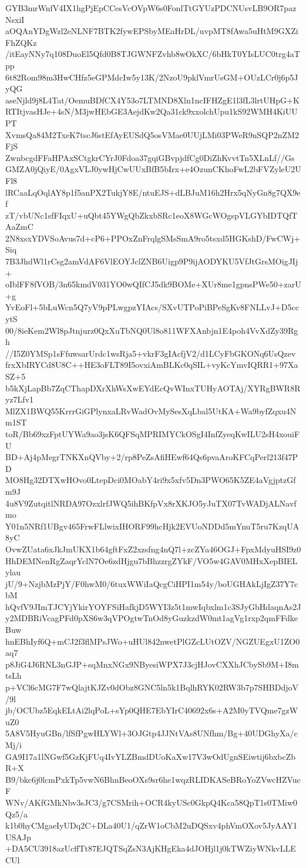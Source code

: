 GYB3mrWnfV4IX1hgPjEpCCesVcOVpW6s0FonlTtGYUzPDCNUsvLB9OR7pazNsxiI
aOQAnYDgWzl2eNLNF7BTK2fywEPSbyMEaHrDL/uvpMT8fAwa5uHtM9GXZiFhZQKz
/itEayNNy7q108DuoEl5Qfd0B8TJGWNFZvhb8wOkXC/6bHkT0YIsLUC0trg4aTpp
6t82Rom98m3HwCHfz5eGPMdcIw5y13K/2NzoU9pklVmrUsGM+OUzLCr0j6p5JyQG
aseNjld9j8L4Tat/OemuBDfCX4Y53o7LTMND8Xln1ncIFHZgE1l3fL3lrtUHpG+K
RTItjvasHJe+4sN/M3jwHEbGE3AejdKw2Qa31ck9xxolchUpu1kS92WMH4KiUUPT
XvmsQa84M2TxeK7tscJ6stEfAyEUSdQ5osVMae0UUjLMi03PWeR9nSQP2nZM2FjS
ZwnbcgdFFaHPAxSCtgkrCYrJ0Fdoa37gqiGBvpjdfCg0DiZhKvvtTn5XLnLf//Gs
GMZA0jQiyE/0AgxVLJ0ywHjCwUUxBfB5bIrx+e4OzunCKhoFwL2bFVZyleU2UFl8
lRCaaLqOqlAY8p1f5anPX2TukjY8E/ntuEJS+dLBJuM16h2Hrx5qNyGn8g7QX9ef
zT/vbUNc1sfFIqxU+uQbt45YWgQbZkxbSRc1eoX8WGcWOgspVLGYbIDTQfTAaZmC
2N8xsxYDVSoAvus7d+cP6+PPOxZnFrqlgSMsSmA9ro5tsxd5HGKshD/FwCWj+Siq
7B3JhdWl1rCsg2amVdAF6VlEOYJclZNB6Uigp9P9ijAODYKU5VfJtGrsMOigJIj+
oIblFF8fVOB/3n65kmdV031YO0wQIfCJ5dk9BOMe+XUr8me1gpnsPWe50+zarU+g
YvEoFl+5bLuWcn5Q7yV9pPLwgpzYIAcs/SXvUTPoPiBPeSgKv8FNLLvJ+D5ccytS
00/8ieKem2Wl8pJtnjurz0QxXuTbNQ0Ul8o811WFXAnbjn1E4poh4VvXdZy39Rgh
//I5Z0YMSp1sFfuwsarUrdc1wsRja5+vkrF3gIAcfjV2/d1LCyFbGKONq6UsQzev
frxXbIRYCd8U8C++HE3oFLT89I5ovxiAmBLKc0qSIL+vyKcYmvIQRR1+97XaSZ+5
b5kXjLapBb7ZqCThapDXrXhWsXwEYdEcQvWInxTUHyAOTAj/XYRgBWR8Ryz7Lfv1
MlZX1BWQ55KrrrGiGPlynxaLRvWadOvMySesXqLbal5UtKA+Wa9byfZqxu4Nm1ST
toR/Bb69xzFptUYWa9ao3jsK6QFSqMPRIMYCkOSgI4InfZyeqKwILU2sH4xouiFU
BD+Aj4pMegrTNKXnQVby+2/rp8PeZsAfiHEwf64Qs6pvaAroKFCqPerl213f47PD
MO8Hg32DTXwHOvo0LtepDci0MOabY4ri9x5xfv5Dn3PWO65K5ZE4aVgjptzGfm9J
4u8V9ZutqitlNRDA97OzxlrfJWQ5ihBKfpVx8rXKJO5yJuTX07TvWADjALNavfmo
Y01n5NRf1UBgv465FrwFLlwixIHORF99hcHjk2EVUoNDDd5mYnuT5ru7KzqUA8yC
OvwZUata6xJkJmUKX1b64gftFxZ2xzsfng4nQ7l+zcZYa46OGJ+FpxMdyuHSI9z0
HhDEMNenRgZaqrYclN7Oe6zdHjgu7bBhzzrgZYkF/VO5w4GAV0MHxXepBIELylau
jU/9+NzjbMzPjY/F0hwM0/6tuxWWiIaQcgCiHPI1m54y/boUGHAkLjIgZ37Y7cbM
hQvfV9JImTJCYjYkirYOYFSiHafkjD5WYI3z5t1mwIqbxlm1c3SJyGbHdaqnAs2J
y2MDBRiVcagPFd0pXS6w3qVPOgtwTnOd8yGuzkzdW0mt1agVg1rxp2qmFFdkeBuw
hnEBhIyf6Q+mCJ2f3flMPsJWo+uHUl842nwetPlGZcLUtOZV/NGZUEgxU1ZO0aq7
p8JiG4J6RNL3nGJP+sqMnxNGx9NByesiWPX7J3cjHJovCXXhJCbySb9M+I8mtsLh
p+VCl6cMG7F7wQlajtKJZv0dObz8GNC5ln5k1BqlhRYK02RW3b7p7SHBDdjoV/9l
jb/OCUbz5EqkELtAi2lqPoL+sYp0QHE7EbYIrC40692x6s+A2M0yTVQme7gzWuZ0
5A8V5HyuGBn/lfSfPgwHLYWl+3OJGtp4JJNtVAs8UNfhm/Bg+40UDGhyXa/cMj/i
GA9I17a1lNGwf5GzKjFUq4IvYLZBmdDUoKaXw17V3wOdUgnSEiwtij6bxbcZbR+X
B9/bkc6j0lcmPxkTp5vwN6BhnBeoOXs9sr6he1wqzRLIDKASeBRoYoZVwcHZVucF
WNv/AKfGMkNbv3sJC3/g7CSMrih+OCR4kyUSc0GkpQ4Kca58QpT1s0TMiw0Qz5/a
k1b0hyCMgaeIyUDq2C+DLa40U1/qZrW1oCbM2uDQSxv4phVmOXov5JyAAY1USAJp
+DA5CU3918azUcffTt87EJQTSqZsN3AjKHgEka4dJOHjl1j0kTWZiyWNkvLLECUl

